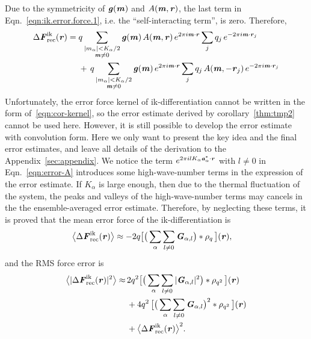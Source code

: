 \documentclass[aps,pre,preprint,unsortedaddress]{revtex4}
\renewcommand{\v}[1]{\textbf{\textit{#1}}}
\begin{document}
Due to the symmetricity of $\v g(\v m)$ and $A(\v m, \v r)$,
the last term in Eqn.~\eqref{eqn:ik.error.force.1},
i.e. the ``self-interacting term'', is zero.
Therefore,
\begin{align}\nonumber
  \Delta\v F_{\textrm{rec}}^{\textrm{ik}}(\v r)
  =\;&
  q
  \sum_{
    \begin{subarray}{c}
      \vert m_{\alpha}\vert < K_\alpha/2\\
      \v m\neq 0
    \end{subarray}}
  \v g(\v m)\,
  A(\v m, \v r)\,
  e^{2\pi i\v m\cdot \v r}
  \sum_{j}q_j\,e^{-2\pi i\v m\cdot\v r_j} \\\label{eqn:ik.error.force}
  & +\,
  q
  \sum_{
    \begin{subarray}{c}
      \vert m_{\alpha}\vert < K_\alpha/2\\
      \v m\neq 0
    \end{subarray}}
  \v g(\v m)\,
  e^{2\pi i\v m\cdot \v r}
  \sum_{j}q_j\,A(\v m, -\v r_j)\,e^{-2\pi i\v m\cdot\v r_j}
\end{align}
Unfortunately, the
error force kernel of ik-differentiation
cannot be written
in the form of~\eqref{eqn:cor-kernel}, so the error estimate derived by
corollary~\ref{thm:tmp2} cannot be used here. However, it is still
possible to develop the error estimate with convolution form.
Here we only want to present the key idea and the final  error
estimates, and leave all details of the derivation 
to the Appendix~\ref{sec:appendix}.  We notice the
term $e^{2\pi i l K_\alpha\v a^\ast_\alpha\cdot\v r}$ with $l\neq 0$
in Eqn.~\eqref{eqn:error-A} introduces some high-wave-number terms in
the expression of the error estimate.  If $K_\alpha$ is large enough,
then due to the thermal fluctuation of the system, the peaks and
valleys of the high-wave-number terms may cancels in the the
ensemble-averaged error estimate.
Therefore, by neglecting these terms, it is proved that the mean error
force of the ik-differentiation is
\begin{align}\label{eqn:ik.meanf}
  \big\langle
  \Delta\v F_{\textrm{rec}}^{\textrm{ik}}(\v r)
  \big\rangle
  & \approx
  - 2 q
  \big[
  \big(
  \sum_{\alpha}\sum_{l\neq 0}\v G_{\alpha,l}
  \big)
  \ast\rho_q\,
  \big] (\v r),
\end{align}
and the RMS force error is 
\begin{align}\nonumber
  \big\langle
  \vert\Delta\v F_{\textrm{rec}}^{\textrm{ik}}(\v r)\vert^2
  \big\rangle
  \approx&\, 
  2q^2
  \big[
  \big(
  \sum_{\alpha} \sum_{l\neq 0}
  \vert \v G_{\alpha,l}\vert^2
  \big)
  \ast \rho_{q^2}
  \,\big] (\v r)\\\nonumber
  &\,+
  4q^2\,
  \big[
  \big(
  \sum_{\alpha} \sum_{l\neq 0}  
  \v G_{\alpha,l}
  \big)^2
  \ast \rho_{q^2}\,
  \big] (\v r) \\\label{eqn:ik.error}
  &\,+
  \big\langle
  \Delta\v F_{\textrm{rec}}^{\textrm{ik}}(\v r)
  \big\rangle^2.
\end{align}
\end{document}
